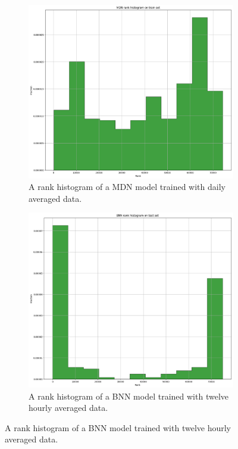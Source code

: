 \documentclass[12pt,a4paper,twoside]{scrartcl}
\numberwithin{equation}{section}
\newcounter{mypagecount}%
\newenvironment{interlude}{%
  \clearpage
  \setcounter{mypagecount}{\value{page}}%
  \thispagestyle{empty}%
  \pagestyle{empty}%
}{%
  \clearpage
  \setcounter{page}{\value{mypagecount}}%
}
\begin{document}
\begin{interlude}
\begin{appendices}
\begin{figure}[h!]
    \end{figure}
    \begin{figure}[h!]
      \centering
      \begin{subfigure}[t]{0.49\textwidth}
        \includegraphics[width=\textwidth,height=0.7\textwidth]{figures/model_plots/mdn-rank-12h}%
        \caption{A rank histogram of a MDN model trained with daily averaged data.}
      \end{subfigure}
      \begin{subfigure}[t]{0.49\textwidth}
        \includegraphics[width=\textwidth,height=0.7\textwidth]{figures/model_plots/bnn-rank-12h}%
        \caption{A rank histogram of a BNN model trained with twelve hourly averaged data.}
      \end{subfigure}

\end{figure}
\end{appendices}
\end{interlude}
\end{document}
